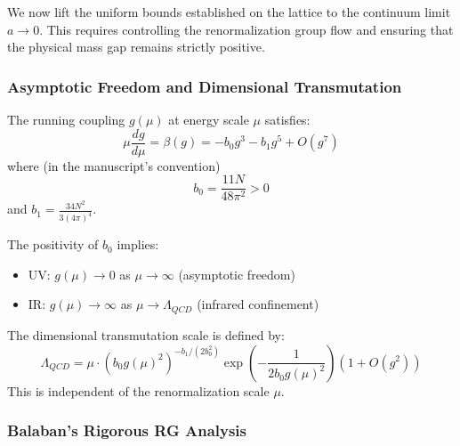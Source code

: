 We now lift the uniform bounds established on the lattice to the continuum limit $a \to 0$. This requires controlling the renormalization group flow and ensuring that the physical mass gap remains strictly positive.

\subsubsection{Asymptotic Freedom and Dimensional Transmutation}

\begin{theorem}
\label{thm:asymptotic_freedom}
The running coupling $g(\mu)$ at energy scale $\mu$ satisfies:
\begin{equation}
\label{eq:dbg-af-beta-function}
\mu \frac{dg}{d\mu} = \beta(g) = -b_0 g^3 - b_1 g^5 + O(g^7)
\end{equation}
where (in the manuscript's convention)
\[
b_0 = \frac{11N}{48\pi^2} > 0
\]
and $b_1 = \frac{34N^2}{3(4\pi)^4}$.
\end{theorem}

The positivity of $b_0$ implies:
\begin{itemize}
\item UV: $g(\mu) \to 0$ as $\mu \to \infty$ (asymptotic freedom)
\item IR: $g(\mu) \to \infty$ as $\mu \to \Lambda_{QCD}$ (infrared confinement)
\end{itemize}

\begin{definition}
The dimensional transmutation scale is defined by:
\begin{equation}
\label{eq:dbg-af-lambda-qcd}
\Lambda_{QCD} = \mu \cdot (b_0 g(\mu)^2)^{-b_1/(2b_0^2)} \exp\left(-\frac{1}{2b_0 g(\mu)^2}\right) \left(1 + O(g^2)\right)
\end{equation}
This is independent of the renormalization scale $\mu$.
\end{definition}

\subsubsection{Balaban's Rigorous RG Analysis}

